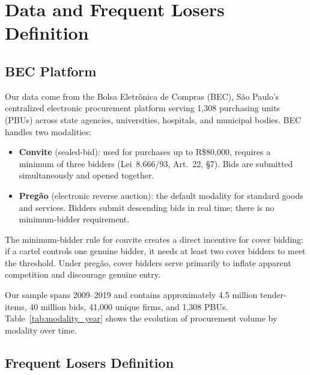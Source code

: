 
\section{Data and Frequent Losers Definition}
\label{sec:data}

\subsection{BEC Platform}
\label{sec:bec}

Our data come from the Bolsa Eletr\^onica de Compras (BEC), S\~ao
Paulo's centralized electronic procurement platform serving 1,308
purchasing units (PBUs) across state agencies, universities, hospitals,
and municipal bodies. BEC handles two modalities:

\begin{itemize}
  \item \textbf{Convite} (sealed-bid): used for purchases up to
    R\$80,000, requires a minimum of three bidders (Lei~8.666/93,
    Art.~22, \S7). Bids are submitted simultaneously and opened together.
  \item \textbf{Preg\~ao} (electronic reverse auction): the default
    modality for standard goods and services. Bidders submit descending
    bids in real time; there is no minimum-bidder requirement.
\end{itemize}

The minimum-bidder rule for convite creates a direct incentive for cover
bidding: if a cartel controls one genuine bidder, it needs at least two
cover bidders to meet the threshold. Under preg\~ao, cover bidders serve
primarily to inflate apparent competition and discourage genuine entry.

Our sample spans 2009--2019 and contains approximately 4.5 million
tender-items, 40 million bids, 41,000 unique firms, and 1,308 PBUs.
Table~\ref{tab:modality_year} shows the evolution of procurement volume
by modality over time.


\subsection{Frequent Losers Definition}
\label{sec:fl_definition}

